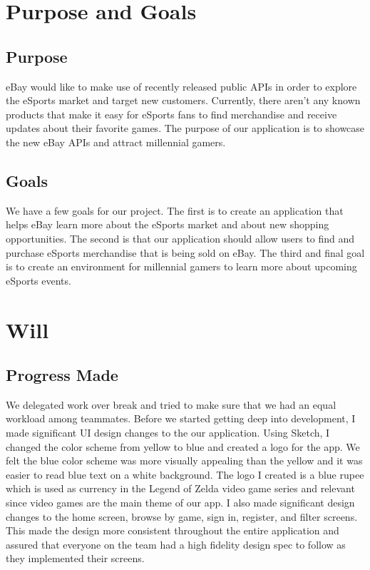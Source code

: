 \documentclass[onecolumn, draftclsnofoot,10pt, compsoc]{IEEEtran}
\begin{document}
\newpage
{}
\tableofcontents
\clearpage

\section{Purpose and Goals}

\subsection{Purpose}
eBay would like to make use of recently released public APIs in order to explore the eSports market and target new customers. 
Currently, there aren’t any known products that make it easy for eSports fans to find merchandise and receive updates about their favorite games. 
The purpose of our application is to showcase the new eBay APIs and attract millennial gamers. 

\subsection{Goals}
We have a few goals for our project. The first is to create an application that helps eBay learn more about the eSports market and about new shopping opportunities. The second is that our application should allow users to find and purchase eSports merchandise that is being sold on eBay. The third and final goal is to create an environment for millennial gamers to learn more about upcoming eSports events.

\section{Will}
\subsection{Progress Made}
We delegated work over break and tried to make sure that we had an equal workload among teammates. Before we started getting deep into development, I made significant UI design changes to the our application. Using Sketch, I changed the color scheme from yellow to blue and created a logo for the app. We felt the blue color scheme was more visually appealing than the yellow and it was easier to read blue text on a white background. The logo I created is a blue rupee which is used as currency in the Legend of Zelda video game series and relevant since video games are the main theme of our app. I also made significant design changes to the home screen, browse by game, sign in, register, and filter screens. This made the design more consistent throughout the entire application and assured that everyone on the team had a high fidelity design spec to follow as they implemented their screens.
\end{document}

